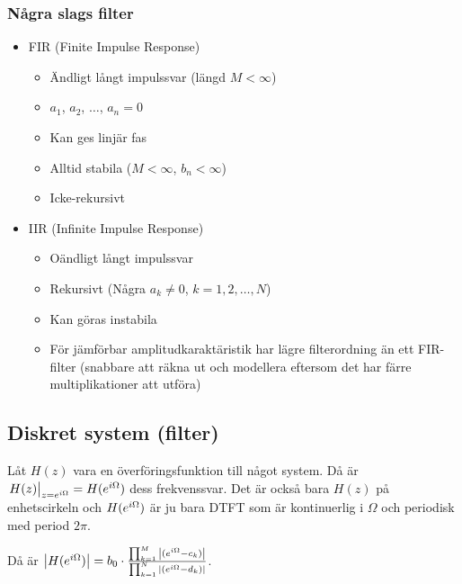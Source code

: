 \documentclass[a4paper]{article}
\begin{document}
\subsubsection{Några slags filter}
\begin{itemize}
    \item FIR (Finite Impulse Response)
        \begin{itemize}
            \item Ändligt långt impulssvar (längd \(
                M < \infty
            \))
            \item \(
                a_1
            \), \(
                a_2
            \), \(
                \dots
            \), \(
                a_n = 0
            \) 
            \item Kan ges linjär fas
            \item Alltid stabila (\(
                M < \infty
            \), \(
                b_n < \infty
            \))
            \item Icke-rekursivt
        \end{itemize}
    \item IIR (Infinite Impulse Response)
        \begin{itemize}
            \item Oändligt långt impulssvar
            \item Rekursivt (Några \(
                a_k \neq 0
            \), \(
                k = 1,2,\dots,N
            \))
            \item Kan göras instabila
            \item För jämförbar amplitudkaraktäristik har lägre filterordning 
                      än ett FIR-filter (snabbare att räkna ut och modellera
                      eftersom det har färre multiplikationer att utföra)
        \end{itemize}
\end{itemize}

\subsection{Diskret system (filter)}
Låt \(
    H(z)
\) vara en överföringsfunktion till något system. Då är \(
    \eval{H(z)}_{z = e^{\iO}} = H(e^\iO)
\) dess frekvenssvar. Det är också bara \(
    H(z)
\) på enhetscirkeln och \(
    H(e^{i\Omega})
\) är ju bara DTFT som är kontinuerlig i \(
    \Omega
\) och periodisk med period \(
    2\pi
\). 

Då är \(
    \abs{H(e^{i\Omega})} 
        = b_0 \cdot \frac{\prod_{k=1}^M \abs{(e^{i\Omega} - c_k)} }{\prod_{k=1}^N \abs{(e^{i\Omega} - d_k)}} 
\). 
\end{document}
